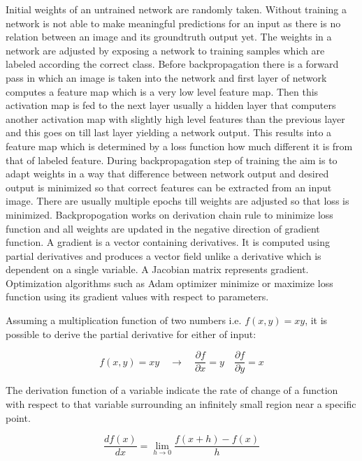 \documentclass[11pt]{article}
\begin{document}
Initial weights of an untrained network are randomly taken. Without training a network is not able to make meaningful predictions for an input as there is no relation between an image and its groundtruth output yet. The weights in a network are adjusted by exposing a network to training samples which are labeled according the correct class. Before backpropagation there is a forward pass in which an image is taken into the network and first layer of network computes a feature map which is a very low level feature map. Then this activation map is fed to the next layer usually a hidden layer that computers another activation map with slightly high level features than the previous layer and this goes on till last layer yielding a network output. This results into a feature map which is determined by a loss function how much different it is from that of labeled feature. During backpropagation step of training the aim is to adapt weights in a way that difference between network output and desired output is minimized so that correct features can be extracted from an input image. There are usually multiple epochs till weights are adjusted so that loss is minimized. Backpropogation works on derivation chain rule to minimize loss function and all weights are updated in the negative direction of gradient function. A gradient is a vector containing derivatives. It is computed using partial derivatives and produces a vector field unlike a derivative which is dependent on a single variable. A Jacobian matrix represents gradient. Optimization algorithms such as Adam optimizer minimize or maximize loss function using its gradient values with respect to parameters.

Assuming a multiplication function of two numbers i.e. $f(x, y)=x y$, it is possible to derive the partial derivative for either of input:

\begin{equation}
f(x, y)=x y \quad \rightarrow \quad \frac{\partial f}{\partial x}=y \quad \frac{\partial f}{\partial y}=x
\end{equation}

The derivation function of a variable indicate the rate of change of a function with respect to that variable surrounding an infinitely small region near a specific point.

\begin{equation}
\frac{d f(x)}{d x}=\lim _{h \rightarrow 0} \frac{f(x+h)-f(x)}{h}
\end{equation}
\end{document}
